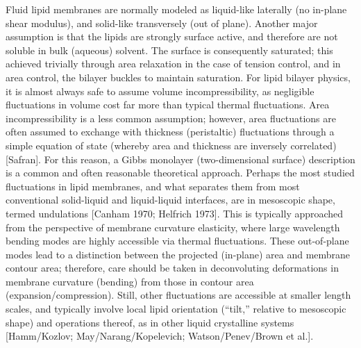\documentclass[9pt,bestpractices]{livecoms}
\begin{document}
Fluid lipid membranes are normally modeled as liquid-like laterally (no in-plane shear modulus), and solid-like transversely (out of plane).
Another major assumption is that the lipids are strongly surface active, and therefore are not soluble in bulk (aqueous) solvent.
The surface is consequently saturated; this achieved trivially through area relaxation in the case of tension control, and in area control, the bilayer buckles to maintain saturation.
For lipid bilayer physics, it is almost always safe to assume volume incompressibility, as negligible fluctuations in volume cost far more than typical thermal fluctuations.
Area incompressibility is a less common assumption; however, area fluctuations are often assumed to exchange with thickness (peristaltic) fluctuations through a simple equation of state (whereby area and thickness are inversely correlated) [Safran].
For this reason, a Gibbs monolayer (two-dimensional surface) description is a common and often reasonable theoretical approach.
Perhaps the most studied fluctuations in lipid membranes, and what separates them from most conventional solid-liquid and liquid-liquid interfaces, are in mesoscopic shape, termed undulations [Canham 1970; Helfrich 1973].
This is typically approached from the perspective of membrane curvature elasticity, where large wavelength bending modes are highly accessible via thermal fluctuations.
These out-of-plane modes lead to a distinction between the projected (in-plane) area and membrane contour area; therefore, care should be taken in deconvoluting deformations in membrane curvature (bending) from those in contour area (expansion/compression).
Still, other fluctuations are accessible at smaller length scales, and typically involve local lipid orientation (``tilt,'' relative to mesoscopic shape) and operations thereof, as in other liquid crystalline systems [Hamm/Kozlov; May/Narang/Kopelevich; Watson/Penev/Brown et al.].
\end{document}
